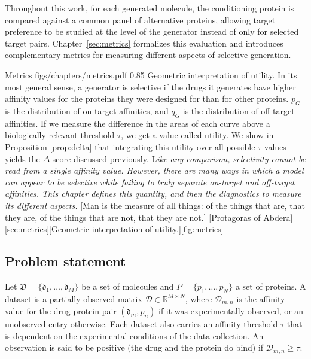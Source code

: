 \documentclass[a4paper,12pt]{article}
\begin{document}
Throughout this work, for each generated molecule, the
conditioning protein is compared against a common panel of alternative
proteins, allowing target preference to be studied at the level of the
generator instead of only for selected target pairs. Chapter~\ref{sec:metrics}
formalizes this evaluation and introduces complementary metrics for measuring
different aspects of selective generation.

\chapteropening
{Metrics}
{figs/chapters/metrics.pdf}
{0.85\textwidth}
{Geometric interpretation of utility. In its most general sense, a generator is selective if the drugs it generates have higher affinity values for the proteins they were designed for than for other proteins. $p_G$ is the distribution of on-target affinities, and $q_G$ is the distribution of off-target affinities. If we measure the difference in the areas of each curve above a biologically relevant threshold $\tau$, we get a value called utility. We show in Proposition \ref{prop:delta} that integrating this utility over all possible $\tau$ values yields the $\Delta$ score discussed previously.}
{%
    \lettrine[
        lines=2,
        lhang=0.0,
        loversize=0.0
    ]{L}{}\textit{ike any comparison, selectivity cannot be read from a single affinity
        value. However, there are many ways in which a model can appear to be selective while
        failing to truly separate on-target and off-target affinities. This chapter
        defines this quantity, and then the diagnostics to measure its different aspects.}
}
[Man is the measure of all things: of the things that are, that they are, of the things that are not, that they are not.]
[Protagoras of Abdera][sec:metrics][Geometric interpretation of utility.][fig:metrics]

\subsection{Problem statement}\label{sec:defs}
Let $\mathfrak D=\{\mathfrak d_1,\ldots,\mathfrak d_M\}$ be a set of molecules and $P=\{p_1,\ldots,p_N\}$ a set of proteins. A dataset is a partially observed matrix $\mathcal{D} \in \mathbb{R}^{M\times N}$, where $\mathcal{D}_{m,n}$ is the affinity value for the drug-protein pair $(\mathfrak{d}_m, p_n)$ if it was experimentally observed, or an unobserved entry otherwise. Each dataset also carries an affinity threshold $\tau$ that is dependent on the experimental conditions of the data collection. An observation is said to be positive (the drug and the protein do bind) if $\mathcal D_{m,n}\geq \tau$.
\end{document}
